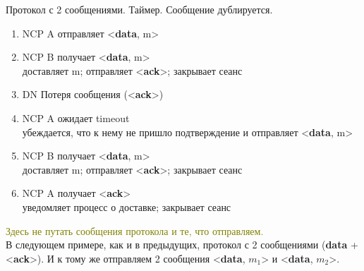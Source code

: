 \begin{algorithm}
	\caption{Протокол с 2 сообщениями. Таймер. Сообщение дублируется.}
	\begin{enumerate}
		\item NCP A отправляет <\textbf{data}, m>
		\item NCP B получает <\textbf{data}, m> \\
			доставляет m; отправляет <\textbf{ack}>; закрывает сеанс
		\item DN Потеря сообщения (<\textbf{ack}>)
		\item NCP A ожидает timeout \\
			убеждается, что к нему не пришло подтверждение и отправляет <\textbf{data}, m>
		\item NCP B получает <\textbf{data}, m> \\
			доставляет m; отправляет <\textbf{ack}>; закрывает сеанс
		\item NCP A получает <\textbf{ack}> \\
			уведомляет процесс о доставке; закрывает сеанс
	\end{enumerate}
\end{algorithm}

\newpage

\textcolor{olive}{Здесь не путать сообщения протокола и те, что отправляем.}\\
В следующем примере, как и в предыдущих, протокол с 2 сообщениями (\textbf{data} + <\textbf{ack}>). И к тому же отправляем 2 сообщения <\textbf{data}, $m_1$> и <\textbf{data}, $m_2$>.

